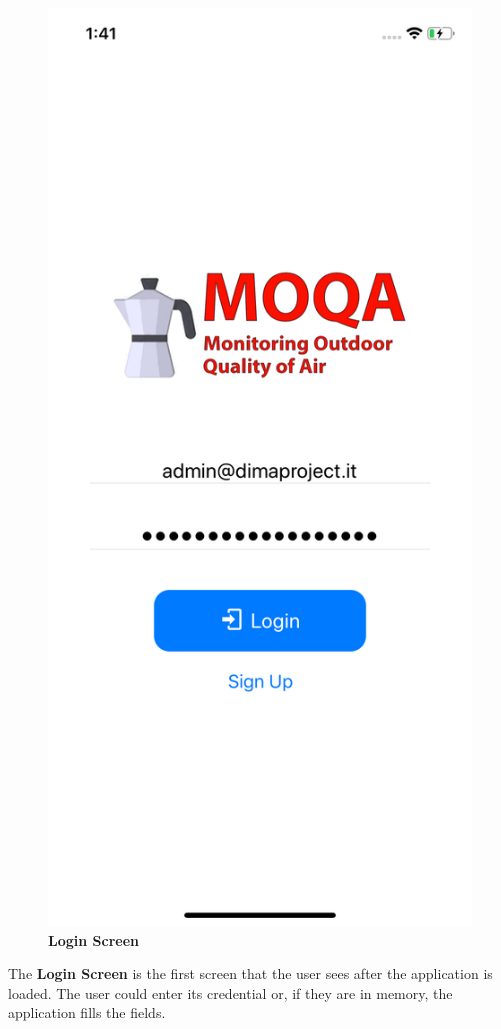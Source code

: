 \begin{figure}[H]
\includegraphics[height=.6\textheight]{./img/ui/login2.png}
\caption{\textbf{Login Screen}}
\end{figure}
\begin{center}
The \textbf{Login Screen} is the first screen that the user sees after the application is loaded. The user could enter its credential or, if they are in memory, the application fills the fields.
\end{center}

